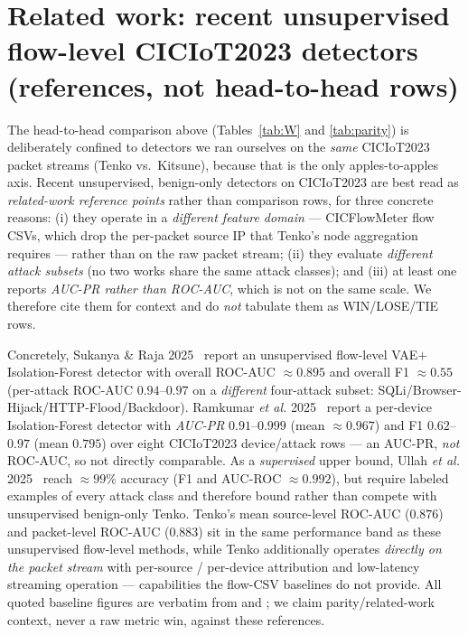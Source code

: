 \documentclass[11pt]{article}
\begin{document}
\section{Related work: recent unsupervised flow-level CICIoT2023 detectors (references, not head-to-head rows)}
\label{sec:baselines}

The head-to-head comparison above (Tables~\ref{tab:W} and \ref{tab:parity}) is deliberately confined to
detectors we ran ourselves on the \emph{same} CICIoT2023 packet streams (Tenko vs.\ Kitsune), because
that is the only apples-to-apples axis. Recent unsupervised, benign-only detectors on CICIoT2023 are
best read as \emph{related-work reference points} rather than comparison rows, for three concrete
reasons: (i) they operate in a \emph{different feature domain} --- CICFlowMeter flow CSVs, which drop
the per-packet source IP that Tenko's node aggregation requires --- rather than on the raw packet
stream; (ii) they evaluate \emph{different attack subsets} (no two works share the same attack
classes); and (iii) at least one reports \emph{AUC-PR rather than ROC-AUC}, which is not on the same
scale. We therefore cite them for context and do \emph{not} tabulate them as WIN/LOSE/TIE rows.

Concretely, Sukanya \& Raja 2025~\cite{sukanya2025} report an unsupervised flow-level
VAE${+}$Isolation-Forest detector with overall ROC-AUC $\approx 0.895$ and overall F1 $\approx 0.55$
(per-attack ROC-AUC $0.94$--$0.97$ on a \emph{different} four-attack subset:
SQLi/Browser-Hijack/HTTP-Flood/Backdoor). Ramkumar \emph{et al.} 2025~\cite{ramkumar2025} report a
per-device Isolation-Forest detector with \emph{AUC-PR} $0.91$--$0.999$ (mean $\approx 0.967$) and F1
$0.62$--$0.97$ (mean $0.795$) over eight CICIoT2023 device/attack rows --- an AUC-PR, \emph{not}
ROC-AUC, so not directly comparable. As a \emph{supervised} upper bound, Ullah \emph{et al.}
2025~\cite{ullah2025} reach $\approx 99\%$ accuracy (F1 and AUC-ROC $\approx 0.992$), but require
labeled examples of every attack class and therefore bound rather than compete with unsupervised
benign-only Tenko. Tenko's mean source-level ROC-AUC ($0.876$) and packet-level ROC-AUC ($0.883$) sit
in the same performance band as these unsupervised flow-level methods, while Tenko additionally
operates \emph{directly on the packet stream} with per-source / per-device attribution and low-latency
streaming operation --- capabilities the flow-CSV baselines do not provide. All quoted baseline figures
are verbatim from  and ;
we claim parity/related-work context, never a raw metric win, against these references.
\end{document}
